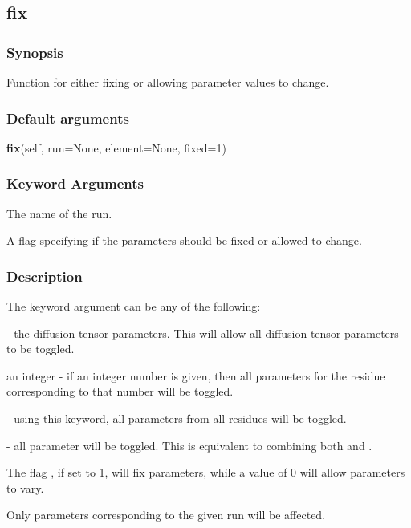 \newpage

\subsection{fix}


\subsubsection{Synopsis}

Function for either fixing or allowing parameter values to change.

\subsubsection{Default arguments}

\textsf{\textbf{fix}(self, run=None, element=None, fixed=1)}


\subsubsection{Keyword Arguments}

  The name of the run.

  A flag specifying if the parameters should be fixed or allowed to change.

\subsubsection{Description}

The keyword argument 
 can be any of the following:

 - the diffusion tensor parameters.  This will allow all diffusion tensor parameters
to be toggled.

an integer - if an integer number is given, then all parameters for the residue
corresponding to that number will be toggled.

 - using this keyword, all parameters from all residues will be toggled.

 - all parameter will be toggled.  This is equivalent to combining both 
 and
.


The flag 
, if set to 1, will fix parameters, while a value of 0 will allow parameters
to vary.


Only parameters corresponding to the given run will be affected.


